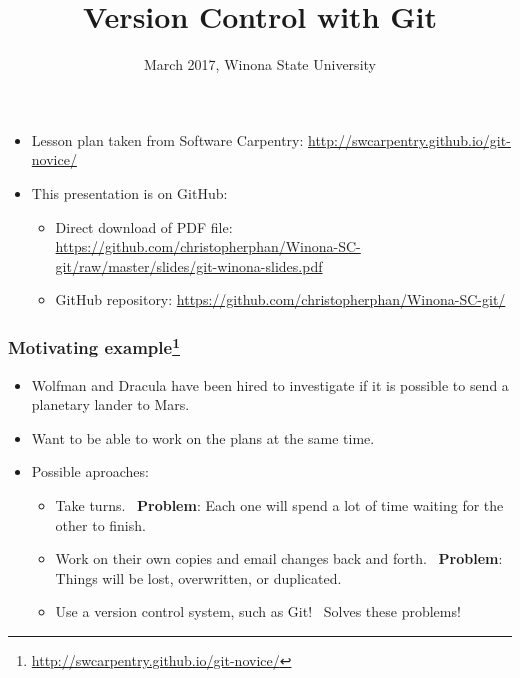 \documentclass{beamer}
\newcommand{\correctans}{\textcolor{green!50!black}{\CheckmarkBold}}
\newcommand{\wrongans}{\textcolor{red!50!black}{\XSolidBold}}
\begin{document}
\begin{frame}
\title{Version Control with Git}
\date{March 2017, Winona State University}

\maketitle

\end{frame}

\begin{frame}

\begin{itemize}
  \item Lesson plan taken from Software Carpentry: \url{http://swcarpentry.github.io/git-novice/}
  \item This presentation is on GitHub:
  \begin{itemize}
\item Direct download of PDF file: \url{https://github.com/christopherphan/Winona-SC-git/raw/master/slides/git-winona-slides.pdf}
\item GitHub repository: \url{https://github.com/christopherphan/Winona-SC-git/}
\end{itemize}
\end{itemize}

\end{frame}

\begin{frame}
  \frametitle{Motivating example\footnote{\url{http://swcarpentry.github.io/git-novice/}}}
\begin{itemize}
\item  Wolfman and Dracula have been hired to investigate if it is possible to send a planetary lander to Mars. \pause
\item Want to be able to work on the plans at the same time.\pause
\item Possible aproaches: \pause
\begin{itemize} \item Take turns. \pause \textcolor{red!50!black}{\wrongans\ \textbf{Problem}: Each one will spend a lot of time waiting for the other to finish.} \pause
  \item Work on their own copies and email changes back and forth. \pause \textcolor{red!50!black}{\wrongans\ \textbf{Problem}: Things will be lost, overwritten, or duplicated.} \pause
\item Use a version control system, such as Git! \pause \textcolor{green!50!black}{\correctans\ Solves these problems!}
\end{itemize}
\end{itemize}
\end{frame}
\end{document}
